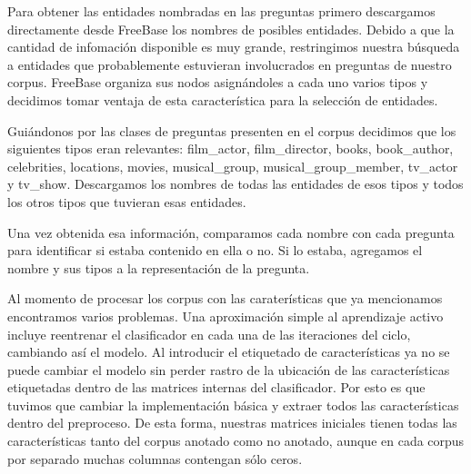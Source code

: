 Para obtener las entidades nombradas en las preguntas primero descargamos directamente desde FreeBase los nombres de posibles entidades. Debido a que la cantidad de infomación disponible es muy grande, restringimos nuestra búsqueda a entidades que probablemente estuvieran involucrados en preguntas de nuestro corpus. FreeBase organiza sus nodos asignándoles a cada uno varios tipos y decidimos tomar ventaja de esta característica para la selección de entidades.

Guiándonos por las clases de preguntas presenten en el corpus decidimos que los siguientes tipos eran relevantes: film\_actor, film\_director, books, book\_author, celebrities, locations, movies, musical\_group, musical\_group\_member, tv\_actor y tv\_show. Descargamos los nombres de todas las entidades de esos tipos y todos los otros tipos que tuvieran esas entidades.

Una vez obtenida esa información, comparamos cada nombre con cada pregunta para identificar si estaba contenido en ella o no. Si lo estaba, agregamos el nombre y sus tipos a la representación de la pregunta.

Al momento de procesar los corpus con las caraterísticas que ya mencionamos encontramos varios problemas. Una aproximación simple al aprendizaje activo incluye reentrenar el clasificador en cada una de las iteraciones del ciclo, cambiando así el modelo. Al introducir el etiquetado de características ya no se puede cambiar el modelo sin perder rastro de la ubicación de las características etiquetadas dentro de las matrices internas del clasificador. Por esto es que tuvimos que cambiar la implementación básica y extraer todos las características dentro del preproceso. De esta forma, nuestras matrices iniciales tienen todas las características tanto del corpus anotado como no anotado, aunque en cada corpus por separado muchas columnas contengan sólo ceros.



